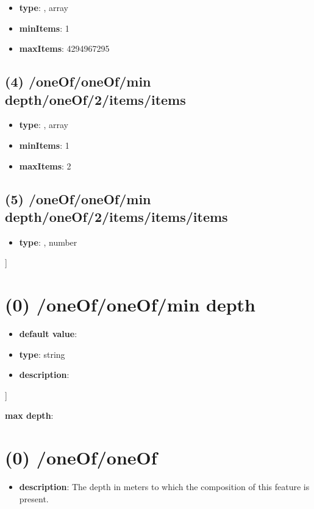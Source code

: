 \begin{itemize}[leftmargin=3em]\item {\bf type}: , array\item {\bf minItems}: 1
\item {\bf maxItems}: 4294967295
\end{itemize}\subsection{(4) /oneOf/oneOf/min depth/oneOf/2/items/items}
\begin{itemize}[leftmargin=4em]\item {\bf type}: , array\item {\bf minItems}: 1
\item {\bf maxItems}: 2
\end{itemize}\subsection{(5) /oneOf/oneOf/min depth/oneOf/2/items/items/items}
\begin{itemize}[leftmargin=5em]\item {\bf type}: , number\end{itemize}]\section{(0) /oneOf/oneOf/min depth}
\begin{itemize}[leftmargin=0em]\item {\bf default value}: 
\item {\bf type}: string
\item {\bf description}: 
\end{itemize}]\item {\bf max depth}: \section{(0) /oneOf/oneOf}
\begin{itemize}[leftmargin=0em]\item {\bf description}: The depth in meters to which the composition of this feature is present.
\end{itemize}
